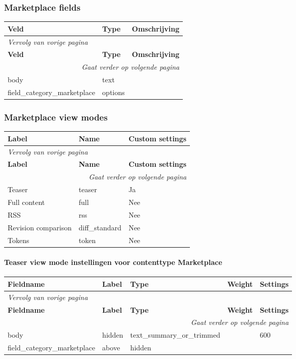 \subsubsection{Marketplace fields}
  \begin{longtable}{| p{5.00cm}|p{5.00cm}|p{5.00cm}|}
  \hline
  \rowcolor{tableheader}
  \textbf{Veld} & \textbf{Type} & \textbf{Omschrijving}  \tabularnewline
  \hline
\endfirsthead
\multicolumn{3}{l}{\textit{Vervolg van vorige pagina}} \\
\hline
\rowcolor{tableheader}
  \textbf{Veld} & \textbf{Type} & \textbf{Omschrijving}  \tabularnewline
  \hline
\hline
\endhead
\multicolumn{3}{r}{\textit{Gaat verder op volgende pagina}} \\
\endfoot
\hline
\endlastfoot
  body & text &   \tabularnewline
  \hline
  field\_category\_marketplace & options &   \tabularnewline
  \hline
  \end{longtable}

\subsubsection{Marketplace view modes}
  \begin{longtable}{| p{5.00cm}|p{5.00cm}|p{5.00cm}|}
  \hline
  \rowcolor{tableheader}
  \textbf{Label} & \textbf{Name} & \textbf{Custom settings}  \tabularnewline
  \hline
\endfirsthead
\multicolumn{3}{l}{\textit{Vervolg van vorige pagina}} \\
\hline
\rowcolor{tableheader}
  \textbf{Label} & \textbf{Name} & \textbf{Custom settings}  \tabularnewline
  \hline
\hline
\endhead
\multicolumn{3}{r}{\textit{Gaat verder op volgende pagina}} \\
\endfoot
\hline
\endlastfoot
  Teaser & teaser & Ja  \tabularnewline
  \hline
  Full content & full & Nee  \tabularnewline
  \hline
  RSS & rss & Nee  \tabularnewline
  \hline
  Revision comparison & diff\_standard & Nee  \tabularnewline
  \hline
  Tokens & token & Nee  \tabularnewline
  \hline
  \end{longtable}

\paragraph{Teaser view mode instellingen voor contenttype Marketplace }

  \begin{longtable}{| p{3.00cm}|p{3.00cm}|p{3.00cm}|p{3.00cm}|p{3.00cm}|}
  \hline
  \rowcolor{tableheader}
  \textbf{Fieldname} & \textbf{Label} & \textbf{Type} & \textbf{Weight} & \textbf{Settings}  \tabularnewline
  \hline
\endfirsthead
\multicolumn{5}{l}{\textit{Vervolg van vorige pagina}} \\
\hline
\rowcolor{tableheader}
  \textbf{Fieldname} & \textbf{Label} & \textbf{Type} & \textbf{Weight} & \textbf{Settings}  \tabularnewline
  \hline
\hline
\endhead
\multicolumn{5}{r}{\textit{Gaat verder op volgende pagina}} \\
\endfoot
\hline
\endlastfoot
  body & hidden & text\_summary\_or\_trimmed &   & 600  \tabularnewline
  \hline
  field\_category\_marketplace & above & hidden &   &    \tabularnewline
  \hline
  \end{longtable}

